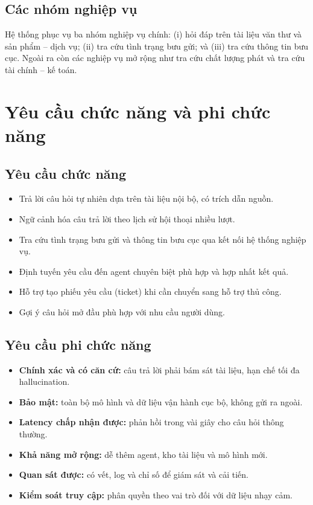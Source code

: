 \subsection{Các nhóm nghiệp vụ}

Hệ thống phục vụ ba nhóm nghiệp vụ chính: (i) hỏi đáp trên tài liệu văn thư và sản phẩm
-- dịch vụ; (ii) tra cứu tình trạng bưu gửi; và (iii) tra cứu thông tin bưu cục. Ngoài ra
còn các nghiệp vụ mở rộng như tra cứu chất lượng phát và tra cứu tài chính -- kế toán.

\section{Yêu cầu chức năng và phi chức năng}
\label{sec:yeucau}

\subsection{Yêu cầu chức năng}

\begin{itemize}
  \item Trả lời câu hỏi tự nhiên dựa trên tài liệu nội bộ, có trích dẫn nguồn.
  \item Ngữ cảnh hóa câu trả lời theo lịch sử hội thoại nhiều lượt.
  \item Tra cứu tình trạng bưu gửi và thông tin bưu cục qua kết nối hệ thống nghiệp vụ.
  \item Định tuyến yêu cầu đến agent chuyên biệt phù hợp và hợp nhất kết quả.
  \item Hỗ trợ tạo phiếu yêu cầu (ticket) khi cần chuyển sang hỗ trợ thủ công.
  \item Gợi ý câu hỏi mở đầu phù hợp với nhu cầu người dùng.
\end{itemize}

\subsection{Yêu cầu phi chức năng}

\begin{itemize}
  \item \textbf{Chính xác và có căn cứ:} câu trả lời phải bám sát tài liệu, hạn chế tối đa
  hallucination.
  \item \textbf{Bảo mật:} toàn bộ mô hình và dữ liệu vận hành cục bộ, không gửi ra ngoài.
  \item \textbf{Latency chấp nhận được:} phản hồi trong vài giây cho câu hỏi thông thường.
  \item \textbf{Khả năng mở rộng:} dễ thêm agent, kho tài liệu và mô hình mới.
  \item \textbf{Quan sát được:} có vết, log và chỉ số để giám sát và cải tiến.
  \item \textbf{Kiểm soát truy cập:} phân quyền theo vai trò đối với dữ liệu nhạy cảm.
\end{itemize}

